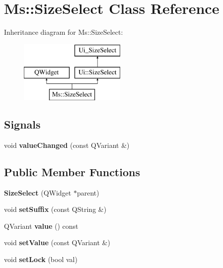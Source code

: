 \hypertarget{class_ms_1_1_size_select}{}\section{Ms\+:\+:Size\+Select Class Reference}
\label{class_ms_1_1_size_select}
Inheritance diagram for Ms\+:\+:Size\+Select\+:\begin{figure}[H]
\begin{center}
\leavevmode
\includegraphics[height=3.000000cm]{class_ms_1_1_size_select}
\end{center}
\end{figure}
\subsection*{Signals}
\begin{DoxyCompactItemize}
\item 
\mbox{\label{class_ms_1_1_size_select_ab6287d946b69b2b87b561a3219211ce4}} 
void {\bfseries value\+Changed} (const Q\+Variant \&)
\end{DoxyCompactItemize}
\subsection*{Public Member Functions}
\begin{DoxyCompactItemize}
\item 
\mbox{\label{class_ms_1_1_size_select_ad21a1e0c54c5c9f13dc73263f9a5764b}} 
{\bfseries Size\+Select} (Q\+Widget $\ast$parent)
\item 
\mbox{\label{class_ms_1_1_size_select_aa38dc2561d2dfe56e795c681f9595bb2}} 
void {\bfseries set\+Suffix} (const Q\+String \&)
\item 
\mbox{\label{class_ms_1_1_size_select_ab24eca96d7c5df0ab93c39e3cdc7760b}} 
Q\+Variant {\bfseries value} () const
\item 
\mbox{\label{class_ms_1_1_size_select_a44604920fbd6390a5a0f779847f316d0}} 
void {\bfseries set\+Value} (const Q\+Variant \&)
\item 
\mbox{\label{class_ms_1_1_size_select_afc6eba9313a533c62596e2c055f3667a}} 
void {\bfseries set\+Lock} (bool val)
\end{DoxyCompactItemize}
